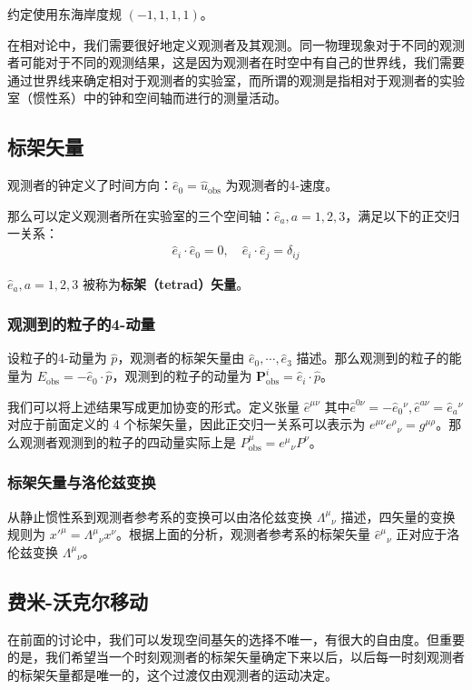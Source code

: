 

约定使用东海岸度规 $(-1,1,1,1)$。

在相对论中，我们需要很好地定义观测者及其观测。同一物理现象对于不同的观测者可能对于不同的观测结果，这是因为观测者在时空中有自己的世界线，我们需要通过世界线来确定相对于观测者的实验室，而所谓的观测是指相对于观测者的实验室（惯性系）中的钟和空间轴而进行的测量活动。

\subsection{标架矢量}

观测者的钟定义了时间方向：$\hat{e}_0=\hat{u}_\text{obs}$ 为观测者的4-速度。

那么可以定义观测者所在实验室的三个空间轴：$\hat{e}_a,a=1,2,3$，满足以下的正交归一关系：
\begin{equation}
\begin{aligned}
\hat{e}_i\cdot \hat{e}_0=0,\quad \hat{e}_i\cdot \hat{e}_j=\delta_{ij}
\end{aligned}
\end{equation}

$\hat{e}_a,a=1,2,3$ 被称为\textbf{标架（tetrad）矢量}。
\subsubsection{观测到的粒子的4-动量}
设粒子的4-动量为 $\hat p$，观测者的标架矢量由 $\hat{e}_0,\cdots,\hat{e}_3$ 描述。那么观测到的粒子的能量为 $E_\text{obs}=-\hat{e}_0\cdot\hat{p}$，观测到的粒子的动量为 $\boldsymbol P_\text{obs}^i=\hat{e}_i\cdot\hat{p}$。

我们可以将上述结果写成更加协变的形式。定义张量 $\hat{e}^{\mu\nu}$ 其中$\hat{e}^{0\nu}=-\hat{e}_0{}^\nu,\hat{e}^{a\nu}=\hat{e}_a{}^\nu$ 对应于前面定义的 4 个标架矢量，因此正交归一关系可以表示为 $e^{\mu\nu} e^\rho{}_\nu=g^{\mu\rho}$。那么观测者观测到的粒子的四动量实际上是 $P^\mu_\text{obs}=e^\mu{}_\nu P^\nu$。
\subsubsection{标架矢量与洛伦兹变换}
从静止惯性系到观测者参考系的变换可以由洛伦兹变换 $\Lambda^\mu{}_\nu$ 描述，四矢量的变换规则为 ${x'}^{\mu}=\Lambda^\mu{}_\nu x^\nu$。根据上面的分析，观测者参考系的标架矢量 $\hat{e}^\mu{}_\nu$ 正对应于洛伦兹变换 $\Lambda^\mu{}_\nu$。
\subsection{费米-沃克尔移动}
在前面的讨论中，我们可以发现空间基矢的选择不唯一，有很大的自由度。但重要的是，我们希望当一个时刻观测者的标架矢量确定下来以后，以后每一时刻观测者的标架矢量都是唯一的，这个过渡仅由观测者的运动决定。

